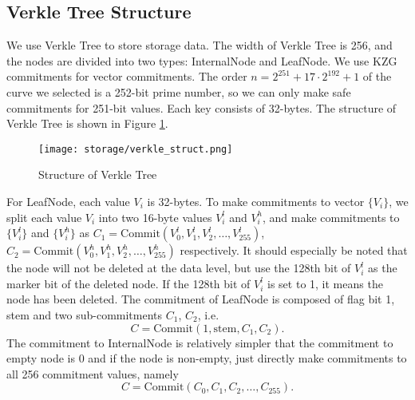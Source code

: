 \subsection{Verkle Tree Structure}

We use Verkle Tree to store storage data. The width of Verkle Tree is 256, and the nodes are divided into two types: InternalNode and LeafNode. We use KZG commitments for vector commitments. The order $n = 2^{251} + 17 \cdot 2^{192} + 1$ of the curve we selected is a 252-bit prime number, so we can only make safe commitments for 251-bit values. Each key consists of 32-bytes. The structure of Verkle Tree is shown in Figure \ref{fig:verkle-tree-struct}.
\begin{figure}[!ht]
    \centering
    \texttt{[image: storage/verkle\_struct.png]}
    \caption{Structure of Verkle Tree}
    \label{fig:verkle-tree-struct}
\end{figure}

For LeafNode, each value $V_i$ is 32-bytes. To make commitments to vector $\{V_i\}$, we split each value $V_i$ into two 16-byte values $V^l_i$ and $V^h_i$, and make commitments to $\{V^l_i\}$ and $\{V^h_i\}$ as $C_1 = \mathrm{Commit}(V^l_0, V^l_1, V^l_2, \ldots, V^l_{255})$, $C_2 = \mathrm{Commit}(V^h_0, V^h_1, V^h_2, \ldots, V^h_{255})$ respectively. It should especially be noted that the node will not be deleted at the data level, but use the 128th bit of $V^l_i$ as the marker bit of the deleted node. If the 128th bit of $V^l_i$ is set to 1, it means the node has been deleted. The commitment of LeafNode is composed of flag bit 1, stem and two sub-commitments $C_1$, $C_2$, i.e.
\[ C = \mathrm{Commit}(1, \mathrm{stem}, C_1, C_2). \]
The commitment to InternalNode is relatively simpler that the commitment to empty node is 0 and if the node is non-empty, just directly make commitments to all 256 commitment values, namely
\[ C = \mathrm{Commit}(C_0, C_1, C_2, \ldots, C_{255}). \]
